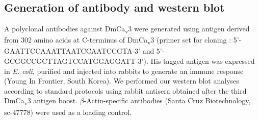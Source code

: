 \subsection*{Generation of antibody and western blot}

A polyclonal antibodies against DmCa\textsubscript{v}3 were generated using antigen derived from 302 amino acids at C-terminus of DmCa\textsubscript{v}3 (primer set for cloning : 5'-GAATTCCAAATTAATCCAATCCGTA-3' and 5'-GCGGCCGCTTAGTCCATGGAGGATT-3'). 
His-tagged antigen was expressed in \emph{E. coli}, purified and injected into rabbits to generate an immune response (Young In Frontier, South Korea).
We performed our western blot analyses according to standard protocols using rabbit antisera obtained after the third DmCa\textsubscript{v}3 antigen boost. $\beta$-Actin-specific antibodies (Santa Cruz Biotechnology, sc-47778) were used as a loading control.
  
  